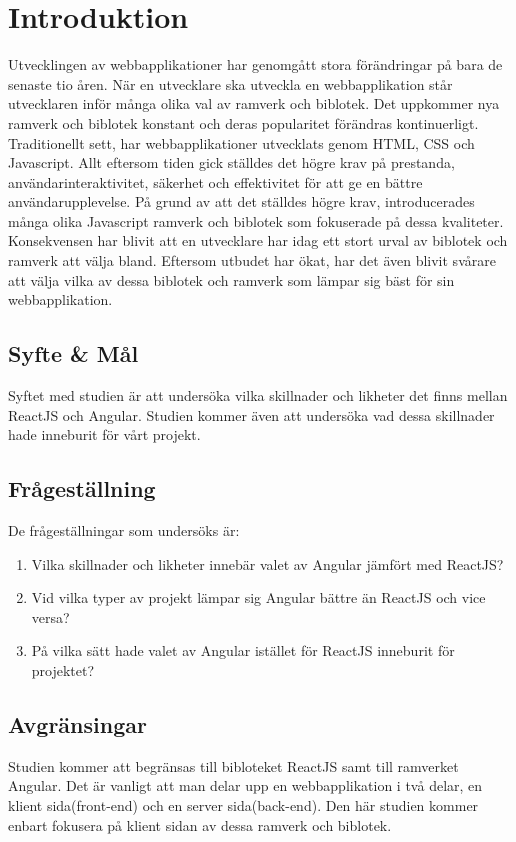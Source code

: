 \section{Introduktion}
\label{sec:axel-introduction}
Utvecklingen av webbapplikationer har genomgått stora förändringar på bara de senaste tio åren. När en utvecklare ska utveckla en webbapplikation står utvecklaren inför många olika val av ramverk och biblotek. Det uppkommer nya ramverk och biblotek konstant och deras popularitet förändras kontinuerligt. Traditionellt sett, har webbapplikationer utvecklats genom HTML, CSS och Javascript. Allt eftersom tiden gick ställdes det högre krav på prestanda, användarinteraktivitet, säkerhet och effektivitet för att ge en bättre användarupplevelse. På grund av att det ställdes högre krav, introducerades många olika Javascript ramverk och biblotek som fokuserade på dessa kvaliteter. Konsekvensen har blivit att en utvecklare har idag ett stort urval av biblotek och ramverk att välja bland. Eftersom utbudet har ökat, har det även blivit svårare att välja vilka av dessa biblotek och ramverk som lämpar sig bäst för sin webbapplikation.

\subsection{Syfte \& Mål}
\label{subsec:motivation}

Syftet med studien är att undersöka vilka skillnader och likheter det finns mellan ReactJS och Angular. Studien kommer även att undersöka vad dessa skillnader hade inneburit för vårt projekt. 

\subsection{Frågeställning}
\label{subsec:research-questions}

De frågeställningar som undersöks är:

\begin{enumerate}
\item\label{axel-fs:1} Vilka skillnader och likheter innebär valet av Angular jämfört med ReactJS?

\item\label{axel-fs:2} Vid vilka typer av projekt lämpar sig Angular bättre än ReactJS och vice versa?

\item\label{axel-fs:3} På vilka sätt hade valet av Angular istället för ReactJS inneburit för projektet?


\end{enumerate}


\subsection{Avgränsingar}
\label{subsec:delimitations}
Studien kommer att begränsas till bibloteket ReactJS samt till ramverket Angular. Det är vanligt att man delar upp en webbapplikation i två delar, en klient sida(front-end) och en server sida(back-end). Den här studien kommer enbart fokusera på klient sidan av dessa ramverk och biblotek. 

